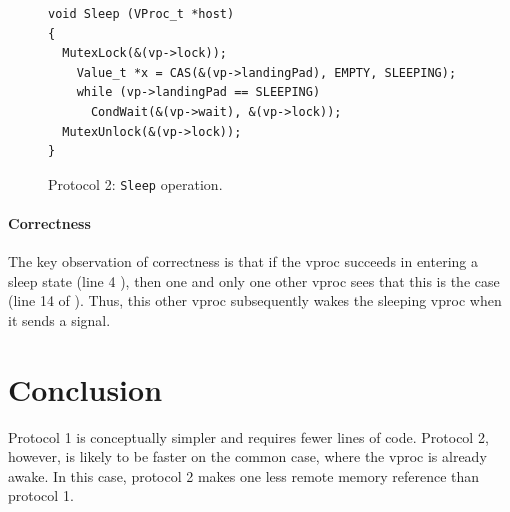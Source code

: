 \documentclass[11pt]{article}
\begin{document}
\begin{figure}
\lstset{language=C}
\lstset{commentstyle=\textit}
\lstset{numbers=left}
\begin{lstlisting}
void Sleep (VProc_t *host)
{
  MutexLock(&(vp->lock));
    Value_t *x = CAS(&(vp->landingPad), EMPTY, SLEEPING);
    while (vp->landingPad == SLEEPING)
      CondWait(&(vp->wait), &(vp->lock));
  MutexUnlock(&(vp->lock));
}
\end{lstlisting}
\caption{Protocol 2: \texttt{Sleep} operation.}\label{fig:protocol2-sleep}
\end{figure}

\paragraph{Correctness}
The key observation of correctness is that if the vproc succeeds in entering a sleep
state (line 4 ), then one and only one other vproc sees 
that this is the case (line 14 of ).
Thus, this other vproc subsequently wakes the sleeping vproc when it sends a signal.

\section{Conclusion}\label{sec:conclusion}
Protocol 1 is conceptually simpler and requires fewer lines of code.
Protocol 2, however, is likely to be faster on the common case, where the vproc is
already awake.
In this case, protocol 2 makes one less remote memory reference than protocol 1.
\end{document}
